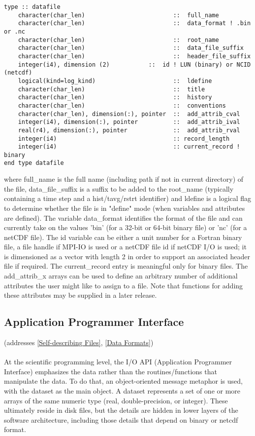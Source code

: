 \documentclass[11pt]{article}
\begin{document}
\begin{verbatim}
type :: datafile
    character(char_len)                         ::  full_name
    character(char_len)                         ::  data_format ! .bin or .nc
    character(char_len)                         ::  root_name
    character(char_len)                         ::  data_file_suffix
    character(char_len)                         ::  header_file_suffix
    integer(i4), dimension (2)           ::  id ! LUN (binary) or NCID (netcdf)
    logical(kind=log_kind)                      ::  ldefine
    character(char_len)                         ::  title
    character(char_len)                         ::  history
    character(char_len)                         ::  conventions
    character(char_len), dimension(:), pointer  ::  add_attrib_cval
    integer(i4), dimension(:), pointer          ::  add_attrib_ival
    real(r4), dimension(:), pointer             ::  add_attrib_rval
    integer(i4)                                 :: record_length
    integer(i4)                                 :: current_record ! binary
end type datafile
\end{verbatim}
\noindent
where full\_name is the full name 
(including path if not in current directory) of the file, 
data\_file\_suffix is a suffix to be added to the root\_name 
(typically containing a time step and a hist/tavg/rstrt identifier) 
and ldefine is a logical flag to determine whether the file is in 
"define" mode (when variables and attributes are defined).  
The variable data\_format identifies the format of the file 
and can currently take on the values 'bin' (for a 32-bit or 
64-bit binary file) or 'nc' (for a netCDF file).  
The id variable can be either a unit number for a Fortran binary file, 
a file handle if MPI-IO is used 
or a netCDF file id if netCDF I/O is used; it is dimensioned as a vector 
with length 2 in order to support an associated header file if required.  
The current\_record entry is meaningful only for binary files.  
The add\_attrib\_x arrays can be used to define an arbitrary number 
of additional attributes the user might like to assign to a file.  
Note that functions for adding these attributes may be supplied in a 
later release.

\subsection{Application Programmer Interface}
\label{Application Programmer Interface}
(addresses \ref{Self-describing Files}, \ref{Data Formats})
\paragraph{}
At the scientific programming level, 
the I/O API (Application Programmer Interface) emphasizes the data 
rather than the routines/functions that manipulate the data.
To do that, an object-oriented message metaphor is used, with the 
dataset as the main object.  
A dataset represents a set of one or more arrays of the same numeric type 
(real, double-precision, or integer).  
These ultimately reside in disk files, but the details are hidden 
in lower layers of the software architecture, including those details 
that depend on binary or netcdf format.  
\end{document}
